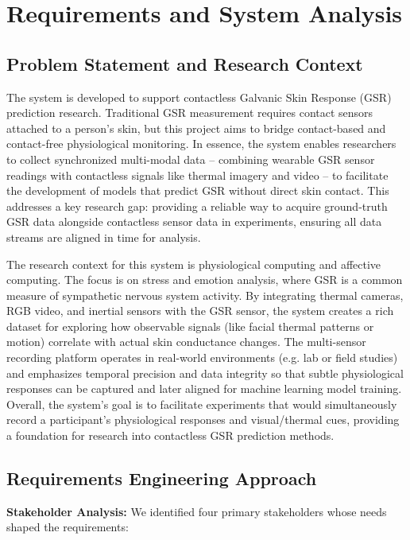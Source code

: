 \label{chap:3}
\chapter{Requirements and System Analysis}

\section{Problem Statement and Research Context}

The system is developed to support contactless Galvanic Skin Response (GSR) prediction research. Traditional GSR measurement requires contact sensors attached to a person's skin, but this project aims to bridge contact-based and contact-free physiological monitoring. In essence, the system enables researchers to collect synchronized multi-modal data -- combining wearable GSR sensor readings with contactless signals like thermal imagery and video -- to facilitate the development of models that predict GSR without direct skin contact. This addresses a key research gap: providing a reliable way to acquire ground-truth GSR data alongside contactless sensor data in experiments, ensuring all data streams are aligned in time for analysis.

The research context for this system is physiological computing and affective computing. The focus is on stress and emotion analysis, where GSR is a common measure of sympathetic nervous system activity. By integrating thermal cameras, RGB video, and inertial sensors with the GSR sensor, the system creates a rich dataset for exploring how observable signals (like facial thermal patterns or motion) correlate with actual skin conductance changes. The multi-sensor recording platform operates in real-world environments (e.g. lab or field studies) and emphasizes temporal precision and data integrity so that subtle physiological responses can be captured and later aligned for machine learning model training. Overall, the system's goal is to facilitate experiments that would simultaneously record a participant's physiological responses and visual/thermal cues, providing a foundation for research into contactless GSR prediction methods.

\section{Requirements Engineering Approach}

\textbf{Stakeholder Analysis:} We identified four primary stakeholders whose needs shaped the requirements:

